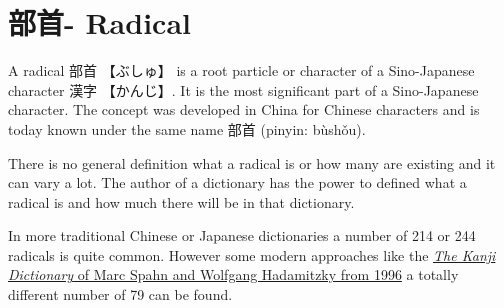 \section{部首- Radical} \label{sec:Radical}

A radical {部首} {【ぶしゅ】} is a root particle or character of a Sino-Japanese 
character {漢字} {【かんじ】}. It is the most significant part of a Sino-Japanese
character. The concept was developed in China for Chinese characters and is
today known under the same name {部首} (pinyin: bùshǒu).

There is no general definition what a radical is or how many are existing and it 
can vary a lot. The author of a dictionary has the power to defined what a radical
is and how much there will be in that dictionary.

In more traditional Chinese or Japanese dictionaries a number of 214 or 244
radicals is quite common. However some modern approaches like the
\href{http://www.hadamitzky.de/english/works_books.htm#KD}{\textit{The Kanji
Dictionary} of Marc Spahn and Wolfgang Hadamitzky from 1996} a totally
different number of 79 can be found.


